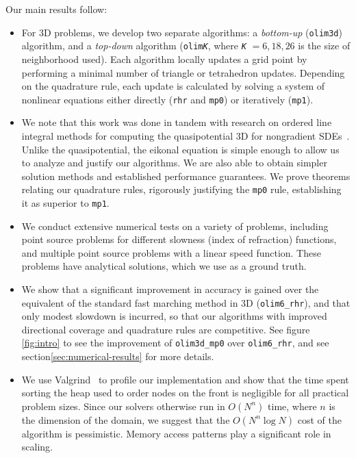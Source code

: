 \documentclass[smallcondensed]{svjour3}
\begin{document}
Our main results follow:
\begin{itemize}
\item For 3D problems, we develop two separate algorithms: a
  \emph{bottom-up} (\texttt{olim3d}) algorithm, and a \emph{top-down}
  algorithm (\texttt{olim\emph{K}}, where \texttt{\emph{K}}
  \hspace{-0.1em}$=6,18,26$ is the size of neighborhood used). Each
  algorithm locally updates a grid point by performing a minimal
  number of triangle or tetrahedron updates. Depending on the
  quadrature rule, each update is calculated by solving a system of
  nonlinear equations either directly (\texttt{rhr} and \texttt{mp0})
  or iteratively (\texttt{mp1}).
\item We note that this work was done in tandem with research on
  ordered line integral methods for computing the quasipotential 3D
  for nongradient
  SDEs~\cite{dahiya2017ordered,yang2019computing,dahiya2018ordered}. Unlike
  the quasipotential, the eikonal equation is simple enough to allow
  us to analyze and justify our algorithms. We are also able to obtain
  simpler solution methods and established performance guarantees. We
  prove theorems relating our quadrature rules, rigorously justifying
  the \texttt{mp0} rule, establishing it as superior to \texttt{mp1}.
\item We conduct extensive numerical tests on a variety of problems,
  including point source problems for different slowness (index of
  refraction) functions, and multiple point source problems with a
  linear speed function. These problems have analytical solutions,
  which we use as a ground truth.
\item We show that a significant improvement in accuracy is gained
  over the equivalent of the standard fast marching method in 3D
  (\texttt{olim6\_rhr}), and that only modest slowdown is incurred, so
  that our algorithms with improved directional coverage and
  quadrature rules are competitive. See figure \ref{fig:intro} to see
  the improvement of \texttt{olim3d\_mp0} over \texttt{olim6\_rhr},
  and see section\@ \ref{sec:numerical-results} for more details.
\item We use Valgrind~\cite{nethercote2007valgrind} to profile our
  implementation and show that the time spent sorting the heap used to
  order nodes on the front is negligible for all practical problem
  sizes. Since our solvers otherwise run in $O(N^n)$ time, where $n$
  is the dimension of the domain, we suggest that the $O(N^n \log N)$
  cost of the algorithm is pessimistic. Memory access patterns play a
  significant role in scaling.
\end{itemize}
\end{document}
